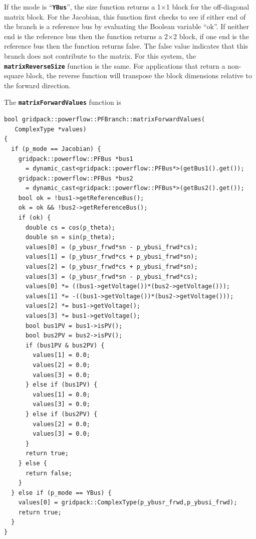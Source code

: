 \documentclass[12pt]{report} %
\begin{document}
If the mode is ``\texttt{\textbf{YBus}}'', the size function returns a 1$\mathrm{\times}$1 block for the off-diagonal matrix block. For the Jacobian, this function first checks to see if either end of the branch is a reference bus by evaluating the Boolean variable ``ok''. If neither end is the reference bus then the function returns a 2$\mathrm{\times}$2 block, if one end is the reference bus then the function returns false. The false value indicates that this branch does not contribute to the matrix. For this system, the \texttt{\textbf{matrixReverseSize}} function is the same. For applications that return a non-square block, the reverse function will transpose the block dimensions relative to the forward direction.

The \texttt{\textbf{matrixForwardValues}} function is

{
\color{red}
\begin{Verbatim}[fontseries=b]
bool gridpack::powerflow::PFBranch::matrixForwardValues(
   ComplexType *values)
{
  if (p_mode == Jacobian) {
    gridpack::powerflow::PFBus *bus1
      = dynamic_cast<gridpack::powerflow::PFBus*>(getBus1().get());
    gridpack::powerflow::PFBus *bus2
      = dynamic_cast<gridpack::powerflow::PFBus*>(getBus2().get());
    bool ok = !bus1->getReferenceBus();
    ok = ok && !bus2->getReferenceBus();
    if (ok) {
      double cs = cos(p_theta);
      double sn = sin(p_theta);
      values[0] = (p_ybusr_frwd*sn - p_ybusi_frwd*cs);
      values[1] = (p_ybusr_frwd*cs + p_ybusi_frwd*sn);
      values[2] = (p_ybusr_frwd*cs + p_ybusi_frwd*sn);
      values[3] = (p_ybusr_frwd*sn - p_ybusi_frwd*cs);
      values[0] *= ((bus1->getVoltage())*(bus2->getVoltage()));
      values[1] *= -((bus1->getVoltage())*(bus2->getVoltage()));
      values[2] *= bus1->getVoltage();
      values[3] *= bus1->getVoltage();
      bool bus1PV = bus1->isPV();
      bool bus2PV = bus2->isPV();
      if (bus1PV & bus2PV) {
        values[1] = 0.0;
        values[2] = 0.0;
        values[3] = 0.0;
      } else if (bus1PV) {
        values[1] = 0.0;
        values[3] = 0.0;
      } else if (bus2PV) {
        values[2] = 0.0;
        values[3] = 0.0;
      }
      return true;
    } else {
      return false;
    }
  } else if (p_mode == YBus) {
    values[0] = gridpack::ComplexType(p_ybusr_frwd,p_ybusi_frwd);
    return true;
  }
}
\end{Verbatim}
}
\end{document}
